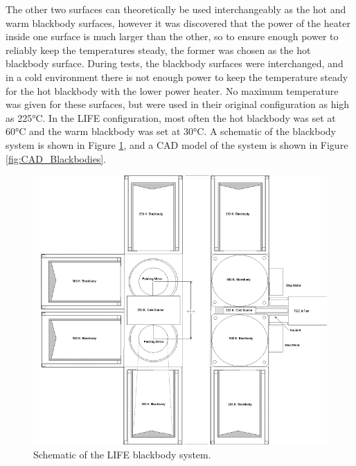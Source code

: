 The other two surfaces can theoretically be used interchangeably as the hot and warm blackbody surfaces, however it was discovered that the power of the heater inside one surface is much larger than the other, so to ensure enough power to reliably keep the temperatures steady, the former was chosen as the hot blackbody surface. During tests, the blackbody surfaces were interchanged, and in a cold environment there is not enough power to keep the temperature steady for the hot blackbody with the lower power heater. No maximum temperature was given for these surfaces, but were used in their original configuration as high as 225°C. In the LIFE configuration, most often the hot blackbody was set at 60°C and the warm blackbody was set at 30°C. A schematic of the blackbody system is shown in Figure \ref{fig:bb_schematic}, and a CAD model of the system is shown in Figure \ref{fig:CAD_Blackbodies}.

\begin{figure}
    \centering
    \includegraphics[width=\linewidth]{chap3_images/Blackbody_schematic.png}
    \caption{Schematic of the LIFE blackbody system.}
    \label{fig:bb_schematic}
\end{figure}

